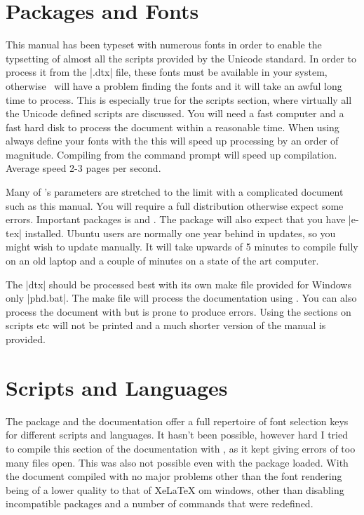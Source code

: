 \section{Packages and Fonts}

This manual has been typeset with numerous fonts in order to enable the typsetting of almost all the scripts provided by the Unicode standard. In order to process it from the |.dtx| file, these fonts must be available in your system, otherwise \XeLaTeX\ will have a problem finding the fonts and it will take an awful long time to process. This is especially true for the scripts section, where virtually all the Unicode defined scripts are discussed. You will need a fast computer and a fast hard disk to process the document within a reasonable time. When using  always define your fonts with the \cmd{\newfontfamily} this will speed up processing by an order of magnitude. Compiling from the command prompt will speed up compilation. Average speed 2-3 pages per second.

Many of \tex's parameters are stretched to the limit with a complicated document such as this manual. You will require a full distribution otherwise expect some errors. Important packages is  and . The package will also expect that you have |e-tex| installed. Ubuntu users are normally one year behind in updates, so you might wish to update manually. It will take upwards of 5 minutes to compile fully on an old laptop and a couple of minutes on a state of the art computer.

The |dtx| should be processed best with its own make file provided for Windows only |phd.bat|. The make file will process the documentation using \lualatex. You can also process the document with \xelatex but is prone to produce errors. Using \latexe the sections on scripts etc will not be printed and a much shorter version of the manual is provided. 

\section{Scripts and Languages}

The package and the documentation offer a full repertoire of font selection keys for different scripts and languages. It hasn't been possible, however hard I tried to compile this section of the documentation with \xelatex, as it kept giving errors of too many files open. This was also not possible even with the  package loaded. With \lualatex the document compiled with no major problems other than the font rendering being of a lower quality to that of XeLaTeX om windows, other than disabling incompatible packages and a number of commands that were redefined. 

